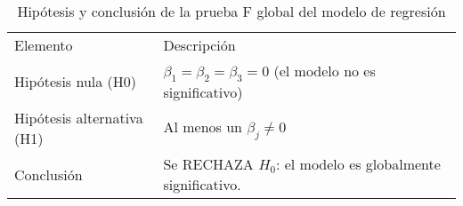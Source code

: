 \begin{table}[H]
    \centering
    \color{blue}
    \caption{Hipótesis y conclusión de la prueba F global del modelo de regresión}
    \label{tab:hipotesis_conclusion}
    \begin{tabular}{ll}
        
        Elemento & Descripción \\
        
        Hipótesis nula (H0) & $\beta_1 = \beta_2 = \beta_3 = 0$ (el modelo no es significativo) \\
        Hipótesis alternativa (H1) & Al menos un $\beta_j \neq 0$ \\
        Conclusión & Se RECHAZA $H_0$: el modelo es globalmente significativo. \\
        
    \end{tabular}
\end{table}
